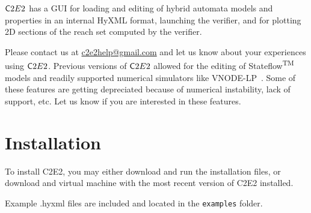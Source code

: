\documentclass{tufte-book} %
\begin{document}
${{\mathsf C2E2}}$ has a GUI for loading and editing of hybrid automata models and properties in an internal HyXML format, launching the verifier, and for plotting 2D sections of the reach set computed by the verifier. 

Please contact us at \href{mailto:c2e2help@gmail.com}{c2e2help@gmail.com} and let us know about your experiences using ${{\mathsf C2E2}}$. 
Previous versions of ${{\mathsf C2E2}}$ allowed for the editing of Stateflow\textsuperscript{TM} models and readily supported numerical simulators like {\sf VNODE-LP}~\citet{vnode2006}. Some of these features are getting depreciated because of numerical instability, lack of support, etc. Let us know if you are interested in these features. 

\chapter{Installation}
To install C2E2, you may either download and run the installation files, or download and virtual machine with the most recent version of C2E2 installed.

Example .hyxml files are included and located in the \texttt{examples} folder. 
\end{document}

